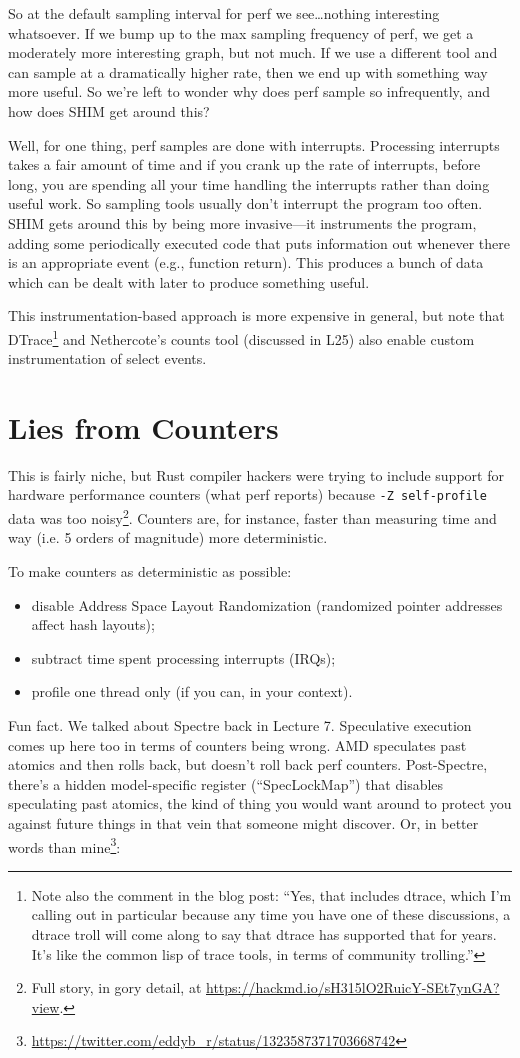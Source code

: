 \documentclass[a4paper]{report}
\begin{document}
So at the default sampling interval for perf we see\ldots nothing interesting whatsoever. If we bump up to the max sampling frequency of perf, we get a moderately more interesting graph, but not much. If we use a different tool and can sample at a dramatically higher rate, then we end up with something way more useful. So we're left to wonder why does perf sample so infrequently, and how does SHIM get around this?

Well, for one thing, perf samples are done with interrupts. Processing interrupts takes a fair amount of time and if you crank up the rate of interrupts, before long, you are spending all your time handling the interrupts rather than doing useful work. So sampling tools usually don't interrupt the program too often. SHIM gets around this by being more invasive---it instruments the program, adding some periodically executed code that puts information out whenever there is an appropriate event (e.g., function return). This produces a bunch of data which can be dealt with later to produce something useful.

This instrumentation-based approach is more expensive in general, but note that DTrace\footnote{Note also the comment in the blog post: ``Yes, that includes dtrace, which I'm calling out in particular because any time you have one of these discussions, a dtrace troll will come along to say that dtrace has supported that for years. It's like the common lisp of trace tools, in terms of community trolling.''} and Nethercote's counts tool (discussed in L25) also enable custom instrumentation of select events. 

\section*{Lies from Counters}
This is fairly niche, but Rust compiler hackers were trying to include
support for hardware performance counters (what perf reports) because
{\tt -Z self-profile} data was too noisy\footnote{Full story, in gory
detail,
at \url{https://hackmd.io/sH315lO2RuicY-SEt7ynGA?view}.}. Counters
are, for instance, faster than measuring time and way (i.e. 5 orders of magnitude) more deterministic.

To make counters as deterministic as possible:
\begin{itemize}[noitemsep]
\item disable Address Space Layout Randomization (randomized pointer addresses affect hash layouts);
\item subtract time spent processing interrupts (IRQs);
\item profile one thread only (if you can, in your context).
\end{itemize}
Fun fact. We talked about Spectre back in Lecture 7. Speculative execution comes up here too in terms of
counters being wrong. AMD speculates past atomics and then rolls back, but doesn't roll back perf counters.
Post-Spectre, there's a hidden model-specific register (``SpecLockMap'') that disables speculating past atomics, the kind of thing you would
want around to protect you against future things in that vein that someone might discover. Or, in better words than mine\footnote{\url{https://twitter.com/eddyb_r/status/1323587371703668742}}:
\end{document}
